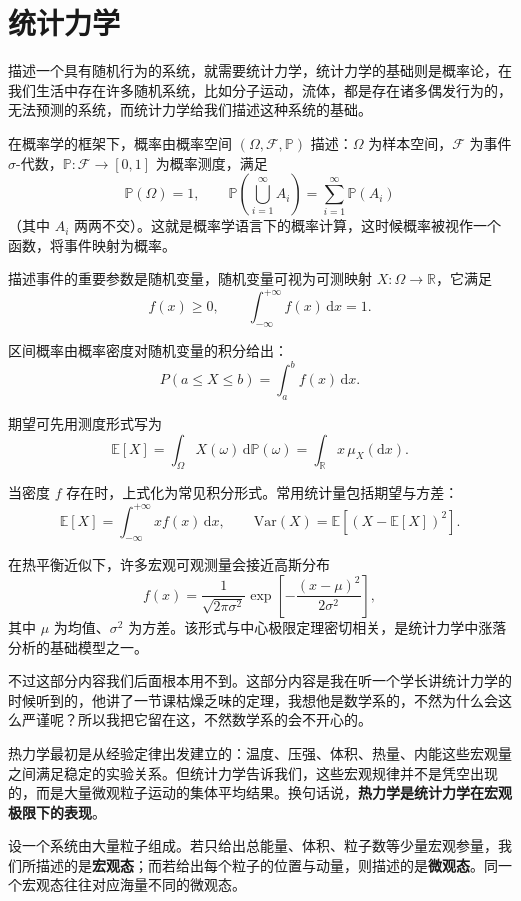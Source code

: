 \documentclass[UTF8]{ctexbook}
\begin{document}
\newpage
\section{统计力学}

描述一个具有随机行为的系统，就需要统计力学，统计力学的基础则是概率论，在我们生活中存在许多随机系统，比如分子运动，流体，都是存在诸多偶发行为的，无法预测的系统，而统计力学给我们描述这种系统的基础。

在概率学的框架下，概率由概率空间 $(\Omega,\mathcal{F},\mathbb{P})$ 描述：$\Omega$ 为样本空间，$\mathcal{F}$ 为事件 $\sigma$-代数，$\mathbb{P}:\mathcal{F}\to[0,1]$ 为概率测度，满足
\[
\mathbb{P}(\Omega)=1,
\qquad
\mathbb{P}\!\left(\bigcup_{i=1}^{\infty}A_i\right)=\sum_{i=1}^{\infty}\mathbb{P}(A_i)
\]
（其中 $A_i$ 两两不交）。这就是概率学语言下的概率计算，这时候概率被视作一个函数，将事件映射为概率。

描述事件的重要参数是随机变量，随机变量可视为可测映射 $X:\Omega\to\mathbb{R}$，它满足
\[
f(x) \ge 0,\qquad \int_{-\infty}^{+\infty} f(x)\,\mathrm{d}x = 1.
\]

区间概率由概率密度对随机变量的积分给出：
\[
P(a\le X\le b)=\int_a^b f(x)\,\mathrm{d}x.
\]

期望可先用测度形式写为
\[
\mathbb{E}[X]=\int_{\Omega}X(\omega)\,\mathrm{d}\mathbb{P}(\omega)=\int_{\mathbb{R}}x\,\mu_X(\mathrm{d}x).
\]

当密度 $f$ 存在时，上式化为常见积分形式。常用统计量包括期望与方差：
\[
\mathbb{E}[X]=\int_{-\infty}^{+\infty}x f(x)\,\mathrm{d}x,
\qquad
\mathrm{Var}(X)=\mathbb{E}\!\left[(X-\mathbb{E}[X])^2\right].
\]

在热平衡近似下，许多宏观可观测量会接近高斯分布
\[
f(x)=\frac{1}{\sqrt{2\pi\sigma^2}}\exp\!\left[-\frac{(x-\mu)^2}{2\sigma^2}\right],
\]
其中 $\mu$ 为均值、$\sigma^2$ 为方差。该形式与中心极限定理密切相关，是统计力学中涨落分析的基础模型之一。

不过这部分内容我们后面根本用不到。这部分内容是我在听一个学长讲统计力学的时候听到的，他讲了一节课枯燥乏味的定理，我想他是数学系的，不然为什么会这么严谨呢？所以我把它留在这，不然数学系的会不开心的。

热力学最初是从经验定律出发建立的：温度、压强、体积、热量、内能这些宏观量之间满足稳定的实验关系。但统计力学告诉我们，这些宏观规律并不是凭空出现的，而是大量微观粒子运动的集体平均结果。换句话说，\textbf{热力学是统计力学在宏观极限下的表现}。

设一个系统由大量粒子组成。若只给出总能量、体积、粒子数等少量宏观参量，我们所描述的是\textbf{宏观态}；而若给出每个粒子的位置与动量，则描述的是\textbf{微观态}。同一个宏观态往往对应海量不同的微观态。
\end{document}
